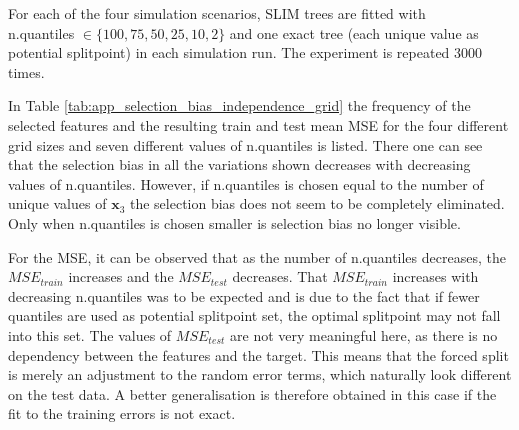 For each of the four simulation scenarios, SLIM trees are fitted  with  \\ n.quantiles $\in \{100, 75, 50, 25, 10, 2\}$ and one exact tree (each unique value as potential splitpoint) in each simulation run. The experiment is repeated 3000 times.

In Table \ref{tab:app_selection_bias_independence_grid} the frequency of the selected features and the resulting train and test mean MSE for the four different grid sizes and seven different values of n.quantiles is listed. There one can see that the selection bias in all the variations shown decreases with decreasing values of n.quantiles. However, if n.quantiles is chosen equal to the number of unique values of $\textbf{x}_3$ the selection bias does not seem to be completely eliminated. Only when n.quantiles is chosen smaller is selection bias no longer visible.

For the MSE, it can be observed that as the number of n.quantiles decreases, the $MSE_{train}$ increases and the $MSE_{test}$ decreases. 
That $MSE_{train}$ increases with decreasing n.quantiles was to be expected and is due to the fact that if fewer quantiles are used as potential splitpoint set, the optimal splitpoint may not fall into this set. 
The values of $MSE_{test}$ are not very meaningful here, as there is no dependency between the features and the target. This means that the forced split is merely an adjustment to the random error terms, which naturally look different on the test data. A better generalisation is therefore obtained in this case if the fit to the training errors is not exact. 

